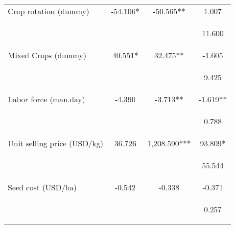 \begin{center}
\begin{tabular}{lccc}
Crop rotation (dummy) & -54.106* & -50.565** & 1.007 \\
\vspace{4pt} & \begin{footnotesize}\end{footnotesize} & \begin{footnotesize}\end{footnotesize} & \begin{footnotesize}11.600\end{footnotesize} \\
Mixed Crops (dummy) & 40.551* & 32.475** & -1.605 \\
\vspace{4pt} & \begin{footnotesize}\end{footnotesize} & \begin{footnotesize}\end{footnotesize} & \begin{footnotesize}9.425\end{footnotesize} \\
Labor force (man.day) & -4.390 & -3.713** & -1.619** \\
\vspace{4pt} & \begin{footnotesize}\end{footnotesize} & \begin{footnotesize}\end{footnotesize} & \begin{footnotesize}0.788\end{footnotesize} \\
Unit selling price (USD/kg) & 36.726 & 1,208.590*** & 93.809* \\
\vspace{4pt} & \begin{footnotesize}\end{footnotesize} & \begin{footnotesize}\end{footnotesize} & \begin{footnotesize}55.544\end{footnotesize} \\
Seed cost (USD/ha) & -0.542 & -0.338 & -0.371 \\
\vspace{4pt} & \begin{footnotesize}\end{footnotesize} & \begin{footnotesize}\end{footnotesize} & \begin{footnotesize}0.257\end{footnotesize} \\

\end{tabular}
\end{center}
